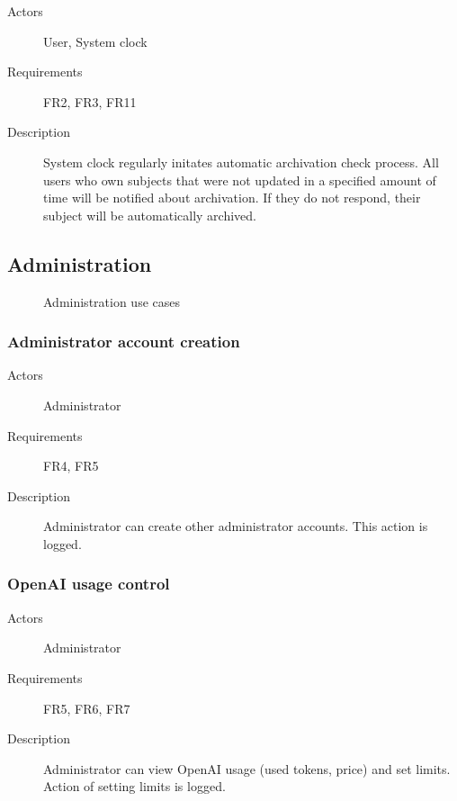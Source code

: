 \documentclass[
    english, %
]{VUMIFPSkursinis}
\begin{document}
\begin{description}
    \item[Actors] User, System clock
    \item[Requirements] FR2, FR3, FR11
    \item[Description] System clock regularly initates automatic archivation check process. All users who own subjects that were not updated in a specified amount of time will be notified about archivation. If they do not respond, their subject will be automatically archived.
\end{description}

\subsection{Administration}

\begin{figure}[ht]
    \centering
    
    \label{administration-use-cases}
    \caption{Administration use cases}
\end{figure}

\subsubsection{Administrator account creation}

\begin{description}
    \item[Actors] Administrator
    \item[Requirements] FR4, FR5
    \item[Description] Administrator can create other administrator accounts. This action is logged.
\end{description}

\subsubsection{OpenAI usage control}

\begin{description}
    \item[Actors] Administrator
    \item[Requirements] FR5, FR6, FR7
    \item[Description] Administrator can view OpenAI usage (used tokens, price) and set limits. Action of setting limits is logged.
\end{description}
\end{document}
